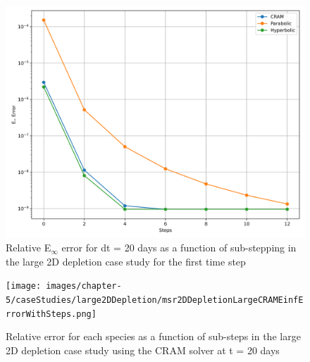 \clearpage

\begin{figure}[p]
    \centering
    \includegraphics[width=5in]{images/chapter-5/caseStudies/large2DDepletion/msrLarge2DDepletionEinfErrorerrorWithSteps.png}
    \caption{Relative E$_{\infty}$ error for dt = 20 days as a function of sub-stepping in the large 2D depletion case study for the first time step}
    \label{fig:large_2D_depletion_Einf_with_substeps}
\end{figure}

\clearpage

\begin{landscape}
\thispagestyle{mylandscape}
\begin{figure}[p]
    \centering
    \texttt{[image: images/chapter-5/caseStudies/large2DDepletion/msr2DDepletionLargeCRAMEinfErrorWithSteps.png]}
    \caption{Relative error for each species as a function of sub-steps in the large 2D depletion case study using the CRAM solver at t = 20 days}
    \label{fig:large_2D_depletion_Einf_species_with_substeps}
\end{figure}
\end{landscape}

\clearpage

